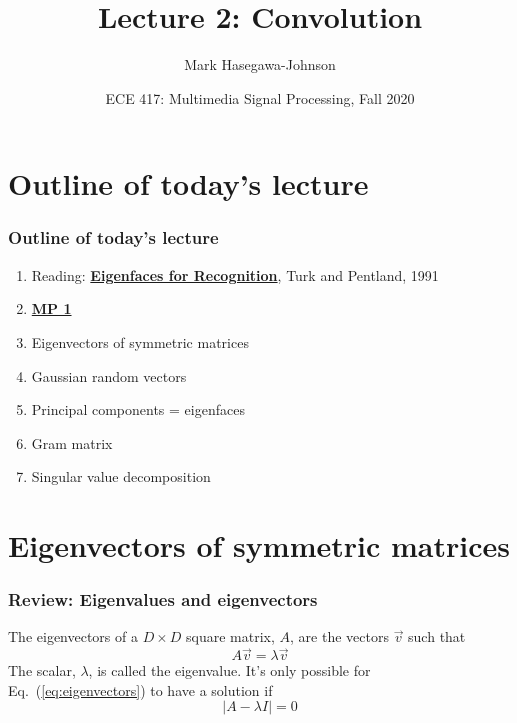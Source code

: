\documentclass{beamer}
\title{Lecture 2: Convolution}
\author{Mark Hasegawa-Johnson}
\date{ECE 417: Multimedia Signal Processing, Fall 2020}
\begin{document}
\begin{frame}
  \maketitle
\end{frame}

\begin{frame}
  \tableofcontents
\end{frame}

\section[Outline]{Outline of today's lecture}
\setcounter{subsection}{1}
\begin{frame}
  \frametitle{Outline of today's lecture}
  \begin{enumerate}
  \item Reading:
    \href{https://www.mitpressjournals.org/doi/pdfplus/10.1162/jocn.1991.3.1.71}{\bf\color{blue}Eigenfaces for Recognition}, Turk and Pentland, 1991
  \item \href{https://courses.engr.illinois.edu/ece417/fa2020/mp1.html}{\bf\color{blue}MP 1}
  \item Eigenvectors of symmetric matrices
  \item Gaussian random vectors
  \item Principal components = eigenfaces
  \item Gram matrix
  \item Singular value decomposition
  \end{enumerate}
\end{frame}

\section[Symmetric]{Eigenvectors of symmetric matrices}
\setcounter{subsection}{1}

\begin{frame}
  \frametitle{Review: Eigenvalues and eigenvectors}
  The eigenvectors of a $D\times D$ square matrix, $A$, are the
  vectors $\vec{v}$ such that
  \begin{equation}
  A\vec{v}=\lambda\vec{v}
  \label{eq:eigenvectors}
  \end{equation}
  The scalar, $\lambda$, is called the eigenvalue.  It's only possible
  for Eq.~(\ref{eq:eigenvectors}) to have a solution if
  \begin{equation}
    |A-\lambda I|=0
    \label{eq:eigenvalues}
  \end{equation}
\end{frame}
\end{document}
